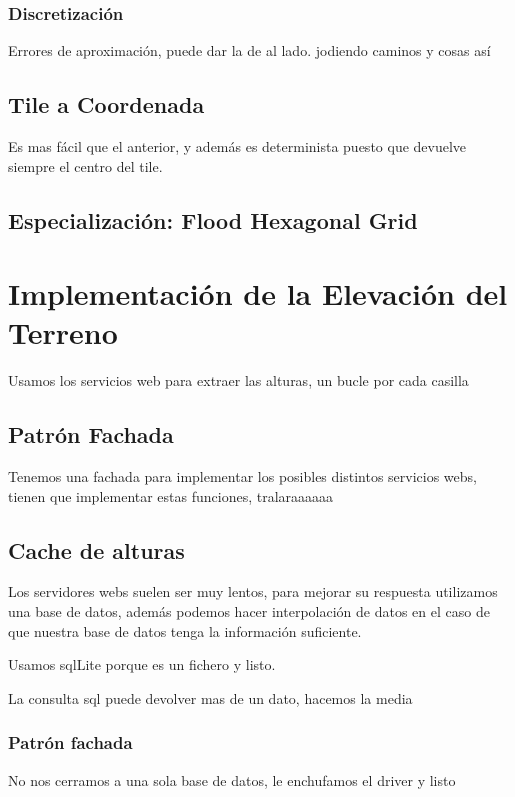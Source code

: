 \subsubsection*{Discretización}
Errores de aproximación, puede dar la de al lado. jodiendo caminos y cosas así
\subsection*{Tile a Coordenada}
Es mas fácil que el anterior, y además es determinista puesto que devuelve
siempre el centro del tile.
\subsection*{Especialización: Flood Hexagonal Grid}
\section*{Implementación de la Elevación del Terreno}
Usamos los servicios web para extraer las alturas, un bucle por cada casilla
\subsection*{Patrón Fachada} %
Tenemos una fachada para implementar los posibles distintos servicios webs,
tienen que implementar estas funciones, tralaraaaaaa
\subsection*{Cache de alturas}
Los servidores webs suelen ser muy lentos, para mejorar su respuesta utilizamos
una base de datos, además podemos hacer interpolación de datos en el caso de
que nuestra base de datos tenga la información suficiente.

Usamos sqlLite porque es un fichero y listo.

La consulta sql puede devolver mas de un dato, hacemos la media
\subsubsection*{Patrón fachada}
No nos cerramos a una sola base de datos, le enchufamos el driver y listo
